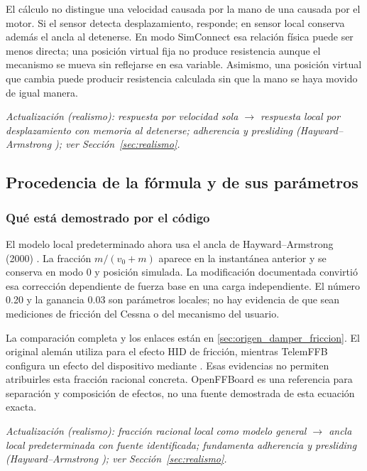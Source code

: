El cálculo no distingue una velocidad causada por la mano de una causada por el motor. Si el sensor detecta desplazamiento, responde; en sensor local conserva además el ancla al detenerse. En modo SimConnect esa relación física puede ser menos directa; una posición virtual fija no produce resistencia aunque el mecanismo se mueva sin reflejarse en esa variable. Asimismo, una posición virtual que cambia puede producir resistencia calculada sin que la mano se haya movido de igual manera.

\textit{Actualización (realismo): respuesta por velocidad sola $\rightarrow$ respuesta local por desplazamiento con memoria al detenerse; adherencia y presliding (Hayward--Armstrong \cite{hayward2000}); ver Sección~\ref{sec:realismo}.}

\subsection{Procedencia de la fórmula y de sus parámetros}
\subsubsection{Qué está demostrado por el código}
El modelo local predeterminado ahora usa el ancla de Hayward--Armstrong (2000) \cite{hayward2000}. La fracción $m/(v_0+m)$ aparece en la instantánea anterior y se conserva en modo 0 y posición simulada. La modificación documentada convirtió esa corrección dependiente de fuerza base en una carga independiente. El número 0.20 y la ganancia 0.03 son parámetros locales; no hay evidencia de que sean mediciones de fricción del Cessna o del mecanismo del usuario.

La comparación completa y los enlaces están en \ref{sec:origen_damper_friccion}. El original alemán utiliza  para el efecto HID de fricción, mientras TelemFFB \cite{telemffb} configura un efecto del dispositivo mediante . Esas evidencias no permiten atribuirles esta fracción racional concreta. OpenFFBoard \cite{openffboard} es una referencia para separación y composición de efectos, no una fuente demostrada de esta ecuación exacta.

\textit{Actualización (realismo): fracción racional local como modelo general $\rightarrow$ ancla local predeterminada con fuente identificada; fundamenta adherencia y presliding (Hayward--Armstrong \cite{hayward2000}); ver Sección~\ref{sec:realismo}.}

